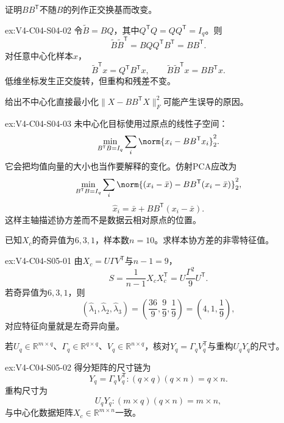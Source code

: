 \begin{SLChapterExercisePairSection}
\begin{exercise}\label{ex:V4-C04-S04-02}
证明$BB^{\mathsf T}$不随$B$的列作正交换基而改变。
\end{exercise}
\ifSLFullEdition
{}\label{sol:V4-C04-S04-02}
\begin{chapterexercisesolution}{ex:V4-C04-S04-02}
令$\widetilde B=BQ$，其中$Q^{\mathsf T}Q=QQ^{\mathsf T}=I_q$。则
\[
\widetilde B\widetilde B^{\mathsf T}
=BQQ^{\mathsf T}B^{\mathsf T}
=BB^{\mathsf T}.
\]
对任意中心化样本$x$，
\[
\widetilde B^{\mathsf T}x=Q^{\mathsf T}B^{\mathsf T}x,
\qquad
\widetilde B\widetilde B^{\mathsf T}x=BB^{\mathsf T}x.
\]
低维坐标发生正交旋转，但重构和残差不变。
\end{chapterexercisesolution}
\fi

\begin{exercise}\label{ex:V4-C04-S04-03}
给出不中心化直接最小化$\|X-BB^{\mathsf T}X\|_F^2$可能产生误导的原因。
\end{exercise}
\ifSLFullEdition
{}\label{sol:V4-C04-S04-03}
\begin{chapterexercisesolution}{ex:V4-C04-S04-03}
未中心化目标使用过原点的线性子空间：
\[
\min_{B^{\mathsf T}B=I_q}
\sum_i\norm{x_i-BB^{\mathsf T}x_i}_2^2.
\]
它会把均值向量的大小也当作要解释的变化。仿射PCA应改为
\[
\min_{B^{\mathsf T}B=I_q}
\sum_i\norm{(x_i-\bar x)-BB^{\mathsf T}(x_i-\bar x)}_2^2,
\]
\[
\widehat x_i=\bar x+BB^{\mathsf T}(x_i-\bar x).
\]
这样主轴描述协方差而不是数据云相对原点的位置。
\end{chapterexercisesolution}
\fi

\begin{exercise}\label{ex:V4-C04-S05-01}
已知$X_c$的奇异值为$6,3,1$，样本数$n=10$。求样本协方差的非零特征值。
\end{exercise}
\ifSLFullEdition
{}\label{sol:V4-C04-S05-01}
\begin{chapterexercisesolution}{ex:V4-C04-S05-01}
由$X_c=U\Gamma V^{\mathsf T}$与$n-1=9$，
\[
S=\frac1{n-1}X_cX_c^{\mathsf T}
=U\frac{\Gamma^2}{9}U^{\mathsf T}.
\]
若奇异值为$6,3,1$，则
\[
(\widehat\lambda_1,\widehat\lambda_2,\widehat\lambda_3)
=\left(\frac{36}{9},\frac9{9},\frac1{9}\right)
=\left(4,1,\frac19\right),
\]
对应特征向量就是左奇异向量。
\end{chapterexercisesolution}
\fi

\begin{exercise}\label{ex:V4-C04-S05-02}
若$U_q\in\mathbb R^{m\times q}$、$\Gamma_q\in\mathbb R^{q\times q}$、$V_q\in\mathbb R^{n\times q}$，核对$Y_q=\Gamma_qV_q^{\mathsf T}$与重构$U_qY_q$的尺寸。
\end{exercise}
\ifSLFullEdition
{}\label{sol:V4-C04-S05-02}
\begin{chapterexercisesolution}{ex:V4-C04-S05-02}
得分矩阵的尺寸链为
\[
Y_q=\Gamma_qV_q^{\mathsf T}:
(q\times q)(q\times n)=q\times n.
\]
重构尺寸为
\[
U_qY_q:
(m\times q)(q\times n)=m\times n,
\]
与中心化数据矩阵$X_c\in\mathbb R^{m\times n}$一致。
\end{chapterexercisesolution}
\fi


\end{SLChapterExercisePairSection}
